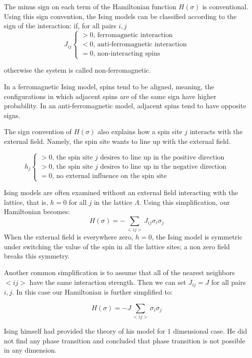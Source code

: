 	
	The minus sign on each term of the Hamiltonian function $H(\sigma)$ is conventional. Using this sign convention, the Ising models can be classified according to the sign of the interaction: if, for all pairs $i,j$
	\begin{equation}
	J_{ij}
	\begin{cases}
		 > 0 \text{, ferromagnetic interaction }\\
		 < 0 \text{, anti-ferromagnetic interaction}\\
		 = 0 \text{, non-interacting spins}
	\end{cases}
	\end{equation}
	
	otherwise the system is called non-ferromagnetic.
	
	In a ferromagnetic Ising model, spins tend to be aligned, meaning, the configurations in which adjacent spins are of the same sign have higher probability. In an anti-ferromagnetic model, adjacent spins tend to have opposite signs.
	
	The sign convention of $H(\sigma)$ also explains how a spin site $j$ interacts with the external field. Namely, the spin site wants to line up with the external field.
	
	\begin{equation}
	h_j
	\begin{cases}
		 > 0 \text{,  the spin site $j$ desires to line up in the positive direction} \\
		 > 0 \text{,  the spin site $j$ desires to line up in the negative direction} \\
		 = 0 \text{,  no external influence on the spin site}
	\end{cases}
	\end{equation}



	Ising models are often examined without an external field interacting with the lattice, that is, $h = 0$ for all $j$ in the lattice $\Lambda$. Using this simplification, our Hamiltonian becomes:
	\begin{equation}
		H(\sigma) = - \sum_{<i j>} J_{i j} \sigma_i \sigma_j
	\end{equation}
	When the external field is everywhere zero, $h = 0$, the Ising model is symmetric under switching the value of the spin in all the lattice sites; a non zero field breaks this symmetry.
	
	Another common simplification is to assume that all of the nearest neighbors $<ij>$ have the same interaction strength. Then we can set $J_{ij} = J$ for all pairs $i,j$. In this case our Hamiltonian is further simplified to:
	
	\begin{equation}
		H(\sigma) = - J \sum_{<i j>} \sigma_i \sigma_j
	\end{equation}
	
	Ising himself had provided the theory of his model for $1$ dimensional case. He did not find any phase transition and concluded that phase transition is not possible in any dimension. 
	
	
